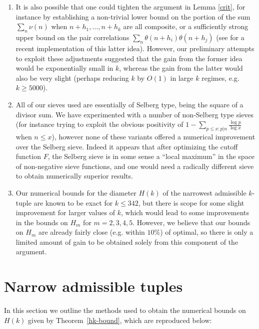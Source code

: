 \documentclass{bmcart}
\theoremstyle{plain}
\theoremstyle{definition}
\begin{document}
\begin{enumerate}
\item It is also possible that one could tighten the argument in Lemma \ref{crit}, for instance by establishing a non-trivial lower bound on the portion of the sum $\sum_n \nu(n)$ when $n+h_1,\dots,n+h_k$ are all composite, or a sufficiently strong upper bound on the pair correlations $\sum_n \theta(n+h_i) \theta(n+h_j)$ (see \cite[\S 6]{banks} for a recent implementation of this latter idea).  However, our preliminary attempts to exploit these adjustments suggested that the gain from the former idea would be exponentially small in $k$, whereas the gain from the latter would also be very slight (perhaps reducing $k$ by $O(1)$ in large $k$ regimes, e.g. $k \geq 5000$).
\item All of our sieves used are essentially of Selberg type, being the square of a divisor sum.  We have experimented with a number of non-Selberg type sieves (for instance trying to exploit the obvious positivity of $1 - \sum_{p \leq x: p|n} \frac{\log p}{\log x}$ when $n \leq x$), however none of these variants offered a numerical improvement over the Selberg sieve.  Indeed it appears that after optimizing the cutoff function $F$, the Selberg sieve is in some sense a ``local maximum'' in the space of non-negative sieve functions, and one would need a radically different sieve to obtain numerically superior results.
\item Our numerical bounds for the diameter $H(k)$ of the narrowest admissible $k$-tuple are known to be exact for $k \leq 342$, but there is scope for some slight improvement for larger values of $k$, which would lead to some improvements in the bounds on $H_m$ for $m=2,3,4,5$.  However, we believe that our bounds on $H_m$ are already fairly close (e.g. within $10\%$) of optimal, so there is only a limited amount of gain to be obtained solely from this component of the argument.
\end{enumerate}

\section{Narrow admissible tuples}\label{tuples-sec}

In this section we outline the methods used to obtain the numerical bounds on $H(k)$ given by Theorem~\ref{hk-bound}, which are reproduced below:
\smallskip
\end{document}
